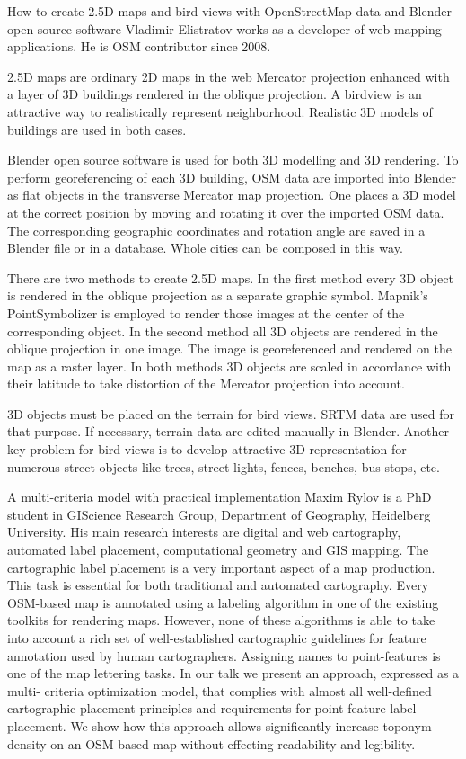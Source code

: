 %
{How to create 2.5D maps and bird views with OpenStreetMap data and Blender open source software}%
{Vladimir Elistratov works as a developer of web mapping applications. He is OSM contributor since 2008. }%
{2.5D maps are ordinary 2D maps in the web Mercator projection enhanced with a layer of 3D buildings rendered in the oblique projection. A birdview is an attractive way to realistically represent neighborhood. Realistic 3D models of buildings are used in both cases.

Blender open source software is used for both 3D modelling and 3D rendering. To perform georeferencing of each 3D building, OSM data are imported into Blender as flat objects in the transverse Mercator map projection. One places a 3D model at the correct position by moving and rotating it over the imported OSM data. The corresponding geographic coordinates and rotation angle are saved in a Blender file or in a database. Whole cities can be composed in this way.

There are two methods to create 2.5D maps. In the first method every 3D object is rendered in the oblique projection as a separate graphic symbol. Mapnik's PointSymbolizer is employed to render those images at the center of the corresponding object. In the second method all 3D objects are rendered in the oblique projection in one image. The image is georeferenced and rendered on the map as a raster layer. In both methods 3D objects are scaled in accordance with their latitude to take distortion of the Mercator projection into account.

3D objects must be placed on the terrain for bird views. SRTM data are used for that purpose. If necessary, terrain data are edited manually in Blender. Another key problem for bird views is to develop attractive 3D representation for numerous street objects like trees, street lights, fences, benches, bus stops, etc.}

%
{A multi-criteria model with practical implementation}%
{Maxim Rylov is a PhD student in GIScience Research Group, Department of Geography, Heidelberg University. His main research interests are digital and web cartography, automated label placement, computational geometry and GIS mapping.}%
{The cartographic label placement is a very important aspect of a map production. This task is essential for both traditional and automated cartography. Every OSM-based map is annotated using a labeling algorithm in one of the existing toolkits for rendering maps.  However, none of these algorithms is able to take into account a rich set of well-established cartographic guidelines for feature annotation used by human cartographers. Assigning names to point-features is one of the map lettering tasks. In our talk we present an approach, expressed as a multi-
criteria optimization model, that complies with almost all well-defined cartographic placement principles and requirements for point-feature label placement. We show how this approach allows significantly increase toponym density on an OSM-based map without effecting readability and legibility.}


